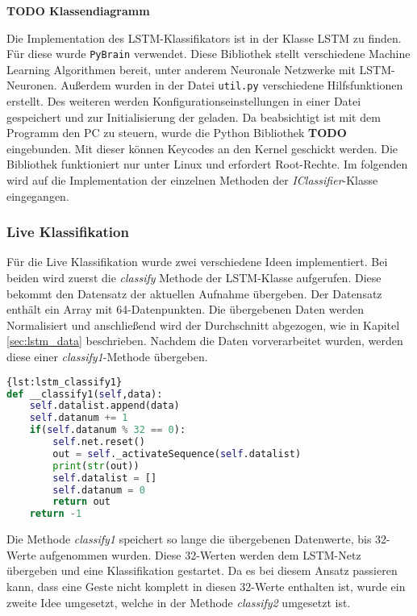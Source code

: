 \textbf{TODO Klassendiagramm}

Die Implementation des \ac{LSTM}-Klassifikators ist in der Klasse LSTM zu
finden.
Für diese wurde \texttt{PyBrain} \cite{schaul2010} verwendet. Diese Bibliothek
stellt verschiedene Machine Learning Algorithmen bereit, unter anderem Neuronale
Netzwerke mit \ac{LSTM}-Neuronen.
Außerdem wurden in der Datei \texttt{util.py} verschiedene Hilfsfunktionen
erstellt.
Des weiteren werden Konfigurationseinstellungen in einer Datei gespeichert und
zur Initialisierung der geladen.
Da beabsichtigt ist mit dem Programm den PC zu steuern, wurde die Python
Bibliothek \cite{Python-uinput}\textbf{TODO} eingebunden. Mit dieser können
Keycodes an den Kernel geschickt werden.
Die Bibliothek funktioniert nur unter Linux und erfordert Root-Rechte.
Im folgenden wird auf die Implementation der einzelnen Methoden der
\textit{IClassifier}-Klasse eingegangen.

\subsubsection*{Live Klassifikation}
Für die Live Klassifikation wurde zwei verschiedene Ideen implementiert. 
Bei beiden wird zuerst die \textit{classify} Methode der LSTM-Klasse 
aufgerufen. Diese bekommt den Datensatz der aktuellen Aufnahme übergeben. 
Der Datensatz enthält ein Array mit 64-Datenpunkten. Die übergebenen Daten werden 
Normalisiert und anschließend wird der Durchschnitt abgezogen, wie in Kapitel 
\autoref{sec:lstm_data} beschrieben. Nachdem die Daten vorverarbeitet wurden, 
werden diese einer \textit{classify1}-Methode übergeben. 
\begin{lstlisting}[language=Python,caption={Classify
Variante 1},label={lst:lstm_classify1}]{lst:lstm_classify1}
def __classify1(self,data):
	self.datalist.append(data)
	self.datanum += 1
	if(self.datanum % 32 == 0):
		self.net.reset()
		out = self._activateSequence(self.datalist)
		print(str(out))
		self.datalist = []
		self.datanum = 0
		return out
	return -1
\end{lstlisting}

Die Methode \textit{classify1} speichert so lange die übergebenen Datenwerte, 
bis 32-Werte aufgenommen wurden. Diese 32-Werten werden dem \ac{LSTM}-Netz 
übergeben und eine Klassifikation gestartet. Da es bei diesem Ansatz passieren kann, 
dass eine Geste nicht komplett in diesen 32-Werte enthalten ist, wurde ein zweite 
Idee umgesetzt, welche in der Methode \textit{classify2} umgesetzt ist.

